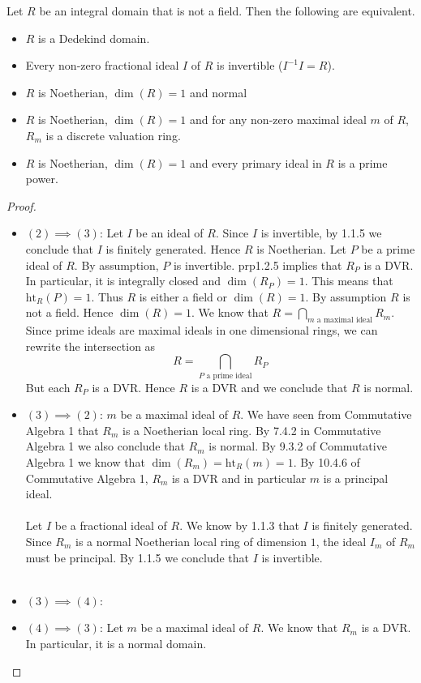 \documentclass[a4paper]{article}
\begin{document}
\begin{prp}{}{} Let $R$ be an integral domain that is not a field. Then the following are equivalent. 
\begin{itemize}
\item $R$ is a Dedekind domain. 
\item Every non-zero fractional ideal $I$ of $R$ is invertible ($I^{-1}I=R$). 
\item $R$ is Noetherian, $\dim(R)=1$ and normal
\item $R$ is Noetherian, $\dim(R)=1$ and for any non-zero maximal ideal $m$ of $R$, $R_m$ is a discrete valuation ring. 
\item $R$ is Noetherian, $\dim(R)=1$ and every primary ideal in $R$ is a prime power. 
\end{itemize} \tcbline
\begin{proof}~\\
\begin{itemize}
\item $(2)\implies(3)$: Let $I$ be an ideal of $R$. Since $I$ is invertible, by 1.1.5 we conclude that $I$ is finitely generated. Hence $R$ is Noetherian. Let $P$ be a prime ideal of $R$. By assumption, $P$ is invertible. prp1.2.5 implies that $R_P$ is a DVR. In particular, it is integrally closed and $\dim(R_P)=1$. This means that $\text{ht}_R(P)=1$. Thus $R$ is either a field or $\dim(R)=1$. By assumption $R$ is not a field. Hence $\dim(R)=1$. We know that $R=\bigcap_{m\text{ a maximal ideal}}R_m$. Since prime ideals are maximal ideals in one dimensional rings, we can rewrite the intersection as $$R=\bigcap_{P\text{ a prime ideal}}R_P$$ But each $R_P$ is a DVR. Hence $R$ is a DVR and we conclude that $R$ is normal. 

\item $(3)\implies(2)$:  $m$ be a maximal ideal of $R$. We have seen from Commutative Algebra 1 that $R_m$ is a Noetherian local ring. By 7.4.2 in Commutative Algebra 1 we also conclude that $R_m$ is normal. By 9.3.2 of Commutative Algebra 1 we know that $\dim(R_m)=\text{ht}_R(m)=1$. By 10.4.6 of Commutative Algebra 1, $R_m$ is a DVR and in particular $m$ is a principal ideal. \\~\\

Let $I$ be a fractional ideal of $R$. We know by 1.1.3 that $I$ is finitely generated. Since $R_m$ is a normal Noetherian local ring of dimension $1$, the ideal $I_m$ of $R_m$ must be principal. By 1.1.5 we conclude that $I$ is invertible. \\~\\

\item $(3)\implies(4)$: 

\item $(4)\implies(3)$: Let $m$ be a maximal ideal of $R$. We know that $R_m$ is a DVR. In particular, it is a normal domain. 
\end{itemize}
\end{proof}
\end{prp}
\end{document}
